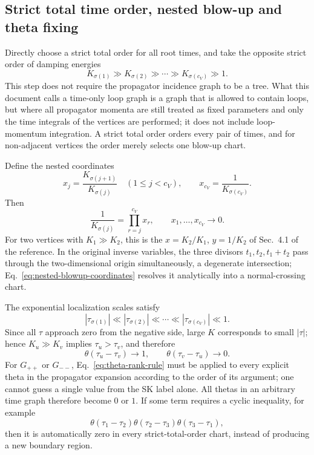 \documentclass[11pt,a4paper]{article}
\begin{document}
\subsection{Strict total time order, nested blow-up and theta fixing}

Directly choose a strict total order for all root times, and take the opposite strict order of damping energies
\begin{equation}
 K_{\sigma(1)}\gg K_{\sigma(2)}\gg\cdots
 \gg K_{\sigma(c_V)}\gg1.
 \label{eq:strict-energy-rank}
\end{equation}
This step does not require the propagator incidence graph to be a tree. What this document calls a time-only loop graph is a graph that is allowed to contain loops, but where all propagator momenta are still treated as fixed parameters and only the time integrals of the vertices are performed; it does not include loop-momentum integration. A strict total order orders every pair of times, and for non-adjacent vertices the order merely selects one blow-up chart.

Define the nested coordinates
\begin{equation}
 x_j=\frac{K_{\sigma(j+1)}}{K_{\sigma(j)}}
 \quad(1\leq j<c_V),
 \qquad
 x_{c_V}=\frac{1}{K_{\sigma(c_V)}}.
 \label{eq:nested-blowup-coordinates}
\end{equation}
Then
\begin{equation}
 \frac{1}{K_{\sigma(j)}}=\prod_{r=j}^{c_V}x_r,
 \qquad x_1,\ldots,x_{c_V}\longrightarrow0.
 \label{eq:nested-energy-inverse}
\end{equation}
For two vertices with $K_1\gg K_2$, this is the $x=K_2/K_1$, $y=1/K_2$ of Sec.~4.1 of the reference. In the original inverse variables, the three divisors $t_1,t_2,t_1+t_2$ pass through the two-dimensional origin simultaneously, a degenerate intersection; Eq.~\eqref{eq:nested-blowup-coordinates} resolves it analytically into a normal-crossing chart.

The exponential localization scales satisfy
\begin{equation}
 |\tau_{\sigma(1)}|\ll|\tau_{\sigma(2)}|\ll\cdots
 \ll|\tau_{\sigma(c_V)}|\ll1.
 \label{eq:tau-rank}
\end{equation}
Since all $\tau$ approach zero from the negative side, large $K$ corresponds to small $|\tau|$; hence $K_u\gg K_v$ implies $\tau_u>\tau_v$, and therefore
\begin{equation}
 \theta(\tau_u-\tau_v)\longrightarrow1,
 \qquad
 \theta(\tau_v-\tau_u)\longrightarrow0.
 \label{eq:theta-rank-rule}
\end{equation}
For $G_{++}$ or $G_{--}$, Eq.~\eqref{eq:theta-rank-rule} must be applied to every explicit theta in the propagator expansion according to the order of its argument; one cannot guess a single value from the SK label alone. All thetas in an arbitrary time graph therefore become $0$ or $1$. If some term requires a cyclic inequality, for example
\begin{equation}
 \theta(\tau_1-\tau_2)\theta(\tau_2-\tau_3)
 \theta(\tau_3-\tau_1),
\end{equation}
then it is automatically zero in every strict-total-order chart, instead of producing a new boundary region.
\end{document}
